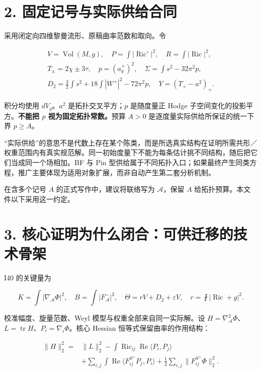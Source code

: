\documentclass[UTF8,a4paper,11pt,fontset=fandol]{ctexart}
\begin{document}
\section{2.
固定记号与实际供给合同}\label{ux56faux5b9aux8bb0ux53f7ux4e0eux5b9eux9645ux4f9bux7ed9ux5408ux540c}

采用闭定向四维黎曼流形、原稿曲率范数和取向。令

\[
\begin{gathered}
V=\operatorname{Vol}(M,g),\quad
P=\int|\operatorname{Ric}^{\circ}|^2,\quad R=\int|\operatorname{Ric}|^2,\\
T_\pm=2\chi\pm3\tau,\quad p=(a_g^+)^2,\quad
\Sigma=\int s^2-32\pi^2p,\\
D_2=\frac32\int s^2+18\int|W^+|^2-72\pi^2p,
\quad Y=(T_+-a^2)_+.
\end{gathered}
\]

积分均使用 \(dV_g\)。\(a^2\) 是拓扑交叉平方；\(p\) 是随度量正 Hodge
子空间变化的投影平方。\textbf{不能把 \(p\) 视为固定拓扑常数。}预算
\(A>0\) 是逐度量实际供给所保证的统一下界 \(p\ge A\)。

``实际供给''的意思不是代数上存在某个陈类，而是所选真实结构在证明所需共形／权重范围内有真实规范解。同一初始度量下不能为每条估计挑不同结构，随后把它们当成同一个场相加。BF
与 Pin
型供给属于不同拓扑入口；如果最终产生同类方程，推广主要体现为适用对象扩展，而非自动产生第二套分析机制。

在含多个记号 \(A\) 的正式写作中，建议将联络写为 \(\mathcal A\)，保留
\(A\) 给拓扑预算。本文件以下采用这一约定。

\section{3.
核心证明为什么闭合：可供迁移的技术骨架}\label{ux6838ux5fc3ux8bc1ux660eux4e3aux4ec0ux4e48ux95edux5408ux53efux4f9bux8fc1ux79fbux7684ux6280ux672fux9aa8ux67b6}

I40 的关键量为

\[
K=\int|\nabla_{\mathcal A}\Phi|^2,\quad
B=\int|F_{\mathcal A}^-|^2,\quad
\Theta=rV+D_2+\varepsilon V,
\quad r=\fint|\operatorname{Ric}+g|^2.
\]

校准幅度、旋量范数、Weyl 模型与权重全部来自同一实际解。设
\(H=\nabla_{\mathcal A}^2\Phi\)、\(L=\operatorname{tr}H\)、\(P_i=\nabla_i\Phi\)。核心
Hessian 恒等式保留曲率的作用结构：

\[
\begin{aligned}
\|H\|_2^2={}&\|L\|_2^2
-\int\operatorname{Ric}_{ij}\operatorname{Re}\langle P_i,P_j\rangle\\
&+\sum_{i,j}\int\operatorname{Re}\langle F^{S^+}_{ij}P_j,P_i\rangle
+\frac12\sum_{i,j}\|F^{S^+}_{ij}\Phi\|_2^2.
\end{aligned}
\tag{M1}
\]
\end{document}
